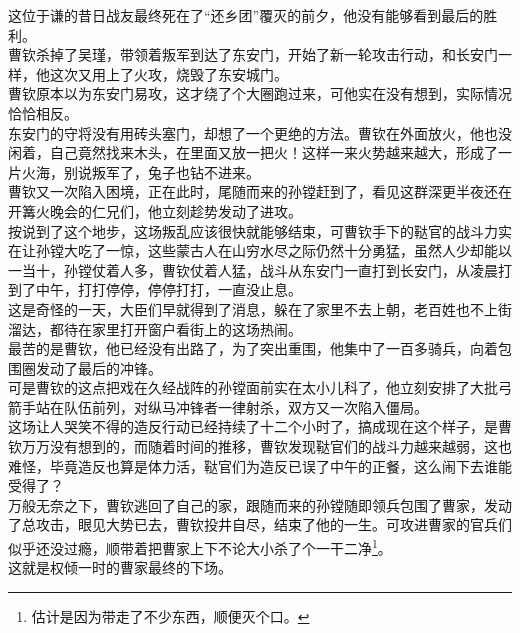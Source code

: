 \begin{multicols}{\theparacolNo}
这位于谦的昔日战友最终死在了“还乡团”覆灭的前夕，他没有能够看到最后的胜利。\\

曹钦杀掉了吴瑾，带领着叛军到达了东安门，开始了新一轮攻击行动，和长安门一样，他这次又用上了火攻，烧毁了东安城门。\\

曹钦原本以为东安门易攻，这才绕了个大圈跑过来，可他实在没有想到，实际情况恰恰相反。\\

东安门的守将没有用砖头塞门，却想了一个更绝的方法。曹钦在外面放火，他也没闲着，自己竟然找来木头，在里面又放一把火！这样一来火势越来越大，形成了一片火海，别说叛军了，兔子也钻不进来。\\

曹钦又一次陷入困境，正在此时，尾随而来的孙镗赶到了，看见这群深更半夜还在开篝火晚会的仁兄们，他立刻趁势发动了进攻。\\

按说到了这个地步，这场叛乱应该很快就能够结束，可曹钦手下的鞑官的战斗力实在让孙镗大吃了一惊，这些蒙古人在山穷水尽之际仍然十分勇猛，虽然人少却能以一当十，孙镗仗着人多，曹钦仗着人猛，战斗从东安门一直打到长安门，从凌晨打到了中午，打打停停，停停打打，一直没止息。\\

这是奇怪的一天，大臣们早就得到了消息，躲在了家里不去上朝，老百姓也不上街溜达，都待在家里打开窗户看街上的这场热闹。\\

最苦的是曹钦，他已经没有出路了，为了突出重围，他集中了一百多骑兵，向着包围圈发动了最后的冲锋。\\

可是曹钦的这点把戏在久经战阵的孙镗面前实在太小儿科了，他立刻安排了大批弓箭手站在队伍前列，对纵马冲锋者一律射杀，双方又一次陷入僵局。\\

这场让人哭笑不得的造反行动已经持续了十二个小时了，搞成现在这个样子，是曹钦万万没有想到的，而随着时间的推移，曹钦发现鞑官们的战斗力越来越弱，这也难怪，毕竟造反也算是体力活，鞑官们为造反已误了中午的正餐，这么闹下去谁能受得了？\\

万般无奈之下，曹钦逃回了自己的家，跟随而来的孙镗随即领兵包围了曹家，发动了总攻击，眼见大势已去，曹钦投井自尽，结束了他的一生。可攻进曹家的官兵们似乎还没过瘾，顺带着把曹家上下不论大小杀了个一干二净\footnote{估计是因为带走了不少东西，顺便灭个口。}。\\

这就是权倾一时的曹家最终的下场。\\


\end{multicols}
